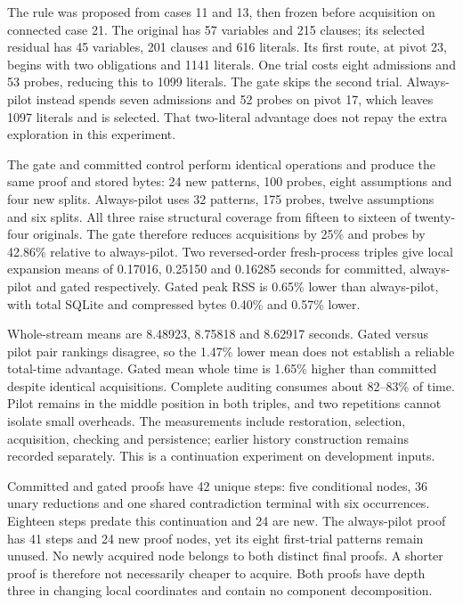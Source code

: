 \documentclass[11pt,a4paper]{article}
\numberwithin{equation}{section}
\theoremstyle{plain}
\theoremstyle{definition}
\theoremstyle{remark}
\begin{document}
The rule was proposed from cases 11 and 13, then frozen before acquisition on
connected case 21. The original has 57 variables and 215 clauses; its selected
residual has 45 variables, 201 clauses and 616 literals. Its first route, at
pivot 23, begins with two obligations and 1141 literals. One trial costs eight
admissions and 53 probes, reducing this to 1099 literals. The gate skips the
second trial. Always-pilot instead spends seven admissions and 52 probes on
pivot 17, which leaves 1097 literals and is selected. That two-literal advantage
does not repay the extra exploration in this experiment.

The gate and committed control perform identical operations and produce the
same proof and stored bytes: 24 new patterns, 100 probes, eight assumptions and
four new splits. Always-pilot uses 32 patterns, 175 probes, twelve assumptions
and six splits. All three raise structural coverage from fifteen to sixteen
of twenty-four originals. The gate therefore reduces acquisitions by 25\% and
probes by 42.86\% relative to always-pilot. Two reversed-order fresh-process
triples give local expansion means of 0.17016, 0.25150 and 0.16285 seconds for
committed, always-pilot and gated respectively. Gated peak RSS is 0.65\% lower
than always-pilot, with total SQLite and compressed bytes 0.40\% and 0.57\% lower.

Whole-stream means are 8.48923, 8.75818 and 8.62917 seconds. Gated versus pilot
pair rankings disagree, so the 1.47\% lower mean does not establish a reliable
total-time advantage. Gated mean whole time is 1.65\% higher than committed
despite identical acquisitions. Complete auditing consumes about 82--83\% of
time. Pilot remains in the middle position in both triples, and two repetitions
cannot isolate small overheads. The measurements include restoration, selection,
acquisition, checking and persistence; earlier history construction remains
recorded separately. This is a continuation experiment on development inputs.

Committed and gated proofs have 42 unique steps: five conditional nodes,
36 unary reductions and one shared contradiction terminal with six occurrences.
Eighteen steps predate this continuation and 24 are new. The always-pilot proof
has 41 steps and 24 new proof nodes, yet its eight first-trial patterns remain
unused. No newly acquired node belongs to both distinct final proofs. A shorter
proof is therefore not necessarily cheaper to acquire. Both proofs have depth
three in changing local coordinates and contain no component decomposition.
\end{document}
